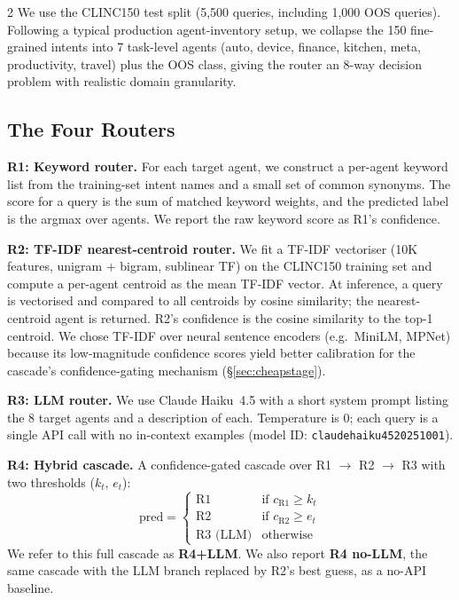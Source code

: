 \documentclass[11pt,a4paper]{article}
\begin{document}
\begin{multicols}{2}
We use the CLINC150 test split (5,500 queries, including 1,000 OOS queries). Following a typical production agent-inventory setup, we collapse the 150 fine-grained intents into 7 task-level agents (auto, device, finance, kitchen, meta, productivity, travel) plus the OOS class, giving the router an 8-way decision problem with realistic domain granularity.

\subsection{The Four Routers}

\textbf{R1: Keyword router.} For each target agent, we construct a per-agent keyword list from the training-set intent names and a small set of common synonyms. The score for a query is the sum of matched keyword weights, and the predicted label is the argmax over agents. We report the raw keyword score as R1's confidence.

\textbf{R2: TF-IDF nearest-centroid router.} We fit a TF-IDF vectoriser (10K features, unigram + bigram, sublinear TF) on the CLINC150 training set and compute a per-agent centroid as the mean TF-IDF vector. At inference, a query is vectorised and compared to all centroids by cosine similarity; the nearest-centroid agent is returned. R2's confidence is the cosine similarity to the top-1 centroid. We chose TF-IDF over neural sentence encoders (e.g.\ MiniLM, MPNet) because its low-magnitude confidence scores yield better calibration for the cascade's confidence-gating mechanism (\S\ref{sec:cheapstage}).

\textbf{R3: LLM router.} We use Claude Haiku~4.5 with a short system prompt listing the 8 target agents and a description of each. Temperature is 0; each query is a single API call with no in-context examples (model ID: \texttt{claude\text{-}haiku\text{-}4\text{-}5\text{-}20251001}).

\textbf{R4: Hybrid cascade.} A confidence-gated cascade over R1 $\to$ R2 $\to$ R3 with two thresholds ($k_t$, $e_t$):
\begin{equation*}
\text{pred} = \begin{cases}
\text{R1} & \text{if } c_{\text{R1}} \geq k_t \\
\text{R2} & \text{if } c_{\text{R2}} \geq e_t \\
\text{R3 (LLM)} & \text{otherwise}
\end{cases}
\end{equation*}
We refer to this full cascade as \textbf{R4+LLM}. We also report \textbf{R4 no-LLM}, the same cascade with the LLM branch replaced by R2's best guess, as a no-API baseline.


\end{multicols}
\end{document}
